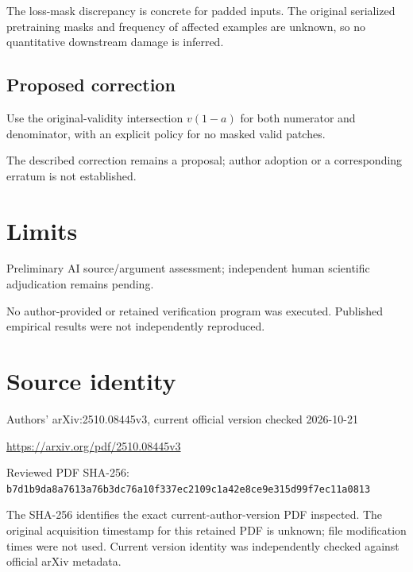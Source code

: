 \documentclass[11pt]{article}
\begin{document}
The loss-mask discrepancy is concrete for padded inputs. The original serialized pretraining masks and frequency of affected examples are unknown, so no quantitative downstream damage is inferred.

\subsection*{Proposed correction}

Use the original-validity intersection \(v(1-a)\) for both numerator and denominator, with an explicit policy for no masked valid patches.

The described correction remains a proposal; author adoption or a corresponding erratum is not established.

\section*{Limits}

Preliminary AI source/argument assessment; independent human scientific adjudication remains pending.\par

No author-provided or retained verification program was executed. Published empirical results were not independently reproduced.\par

\section*{Source identity}

Authors’ arXiv:2510.08445v3, current official version checked 2026-10-21

\url{https://arxiv.org/pdf/2510.08445v3}

Reviewed PDF SHA-256: \nolinkurl{b7d1b9da8a7613a76b3dc76a10f337ec2109c1a42e8ce9e315d99f7ec11a0813}

The SHA-256 identifies the exact current-author-version PDF inspected. The original acquisition timestamp for this retained PDF is unknown; file modification times were not used. Current version identity was independently checked against official arXiv metadata.
\end{document}
